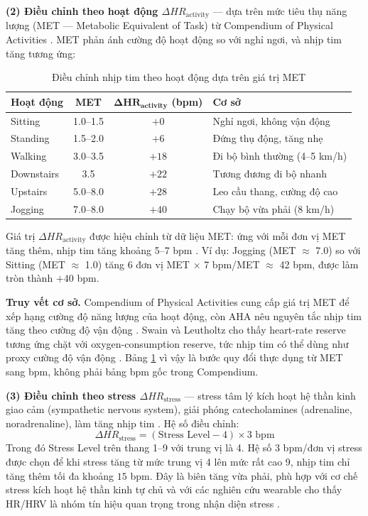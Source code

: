 \textbf{(2) Điều chỉnh theo hoạt động $\Delta HR_{\text{activity}}$} — dựa trên mức tiêu thụ năng lượng (MET — Metabolic Equivalent of Task) từ Compendium of Physical Activities \cite{ainsworth2011compendium}. MET phản ánh cường độ hoạt động so với nghỉ ngơi, và nhịp tim tăng tương ứng:

\begin{table}[H]
\centering
\caption{Điều chỉnh nhịp tim theo hoạt động dựa trên giá trị MET}
\label{tab:hr_activity_modifier}
\begin{tabular}{|l|c|c|l|}
\hline
\textbf{Hoạt động} & \textbf{MET} & $\boldsymbol{\Delta HR_{\text{activity}}}$ \textbf{(bpm)} & \textbf{Cơ sở} \\
\hline
Sitting    & 1.0--1.5 & $+0$  & Nghỉ ngơi, không vận động \\
Standing   & 1.5--2.0 & $+6$  & Đứng thụ động, tăng nhẹ \\
Walking    & 3.0--3.5 & $+18$ & Đi bộ bình thường (4--5 km/h) \\
Downstairs & 3.5      & $+22$ & Tương đương đi bộ nhanh \\
Upstairs   & 5.0--8.0 & $+28$ & Leo cầu thang, cường độ cao \\
Jogging    & 7.0--8.0 & $+40$ & Chạy bộ vừa phải (8 km/h) \\
\hline
\end{tabular}
\end{table}

Giá trị $\Delta HR_{\text{activity}}$ được hiệu chỉnh từ dữ liệu MET: ứng với mỗi đơn vị MET tăng thêm, nhịp tim tăng khoảng 5--7 bpm \cite{swain2000energy}. Ví dụ: Jogging (MET $\approx$ 7.0) so với Sitting (MET $\approx$ 1.0) tăng 6 đơn vị MET $\times$ 7 bpm/MET $\approx$ 42 bpm, được làm tròn thành $+40$ bpm.

\textbf{Truy vết cơ sở.} Compendium of Physical Activities cung cấp giá trị MET để xếp hạng cường độ năng lượng của hoạt động, còn AHA nêu nguyên tắc nhịp tim tăng theo cường độ vận động \cite{ainsworth2011compendium, aha2024heart}. Swain và Leutholtz cho thấy heart-rate reserve tương ứng chặt với oxygen-consumption reserve, tức nhịp tim có thể dùng như proxy cường độ vận động \cite{swain2000energy}. Bảng \ref{tab:hr_activity_modifier} vì vậy là bước quy đổi thực dụng từ MET sang bpm, không phải bảng bpm gốc trong Compendium.

\textbf{(3) Điều chỉnh theo stress $\Delta HR_{\text{stress}}$} — stress tâm lý kích hoạt hệ thần kinh giao cảm (sympathetic nervous system), giải phóng catecholamines (adrenaline, noradrenaline), làm tăng nhịp tim \cite{chrousos2009stress}. Hệ số điều chỉnh:
\begin{equation}
    \Delta HR_{\text{stress}} = (\text{Stress Level} - 4) \times 3 \text{ bpm}
\end{equation}
Trong đó Stress Level trên thang 1--9 với trung vị là 4. Hệ số $3$ bpm/đơn vị stress được chọn để khi stress tăng từ mức trung vị 4 lên mức rất cao 9, nhịp tim chỉ tăng thêm tối đa khoảng $15$ bpm. Đây là biên tăng vừa phải, phù hợp với cơ chế stress kích hoạt hệ thần kinh tự chủ và với các nghiên cứu wearable cho thấy HR/HRV là nhóm tín hiệu quan trọng trong nhận diện stress \cite{hovsepian2015cstress, schmidt2018wesad, giannakakis2019review}.

